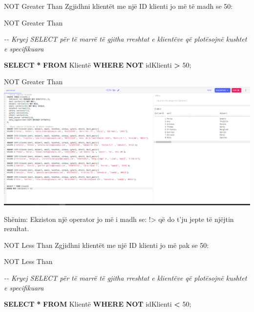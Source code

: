 \documentclass[
  ignorenonframetext,
]{beamer}
\newenvironment{Shaded}{\begin{snugshade}}{\end{snugshade}}
\newcommand{\CommentTok}[1]{\textcolor[rgb]{0.56,0.35,0.01}{\textit{#1}}}
\newcommand{\DecValTok}[1]{\textcolor[rgb]{0.00,0.00,0.81}{#1}}
\newcommand{\KeywordTok}[1]{\textcolor[rgb]{0.13,0.29,0.53}{\textbf{#1}}}
\newcommand{\NormalTok}[1]{#1}
\newcommand{\OperatorTok}[1]{\textcolor[rgb]{0.81,0.36,0.00}{\textbf{#1}}}
\begin{document}
\begin{frame}{NOT Greater Than}
\label{not-greater-than}
Zgjidhni klientët me një ID klienti jo më të madh se 50:
\end{frame}

\begin{frame}[fragile]{NOT Greater Than}
\label{not-greater-than-1}

\begin{Shaded}
\begin{Highlighting}[]
\CommentTok{{-}{-} Kryej SELECT për të marrë të gjitha rreshtat e klientëve që plotësojnë kushtet e specifikuara}

\KeywordTok{SELECT} \OperatorTok{*} \KeywordTok{FROM}\NormalTok{ Klientë}
\KeywordTok{WHERE} \KeywordTok{NOT}\NormalTok{ idKlienti }\OperatorTok{\textgreater{}} \DecValTok{50}\NormalTok{;}
\end{Highlighting}
\end{Shaded}
\end{frame}

\begin{frame}{NOT Greater Than}
\label{not-greater-than-2}
\includegraphics{./Figs/query27.png}

Shënim: Ekziston një operator jo më i madh se: !\textgreater{} që do
t'ju jepte të njëjtin rezultat.
\end{frame}

\begin{frame}{NOT Less Than}
\label{not-less-than}
Zgjidhni klientët me një ID klienti jo më pak se 50:
\end{frame}

\begin{frame}[fragile]{NOT Less Than}
\label{not-less-than-1}

\begin{Shaded}
\begin{Highlighting}[]
\CommentTok{{-}{-} Kryej SELECT për të marrë të gjitha rreshtat e klientëve që plotësojnë kushtet e specifikuara}

\KeywordTok{SELECT} \OperatorTok{*} \KeywordTok{FROM}\NormalTok{ Klientë}
\KeywordTok{WHERE} \KeywordTok{NOT}\NormalTok{ idKlienti }\OperatorTok{\textless{}} \DecValTok{50}\NormalTok{;}
\end{Highlighting}
\end{Shaded}
\end{frame}
\end{document}
